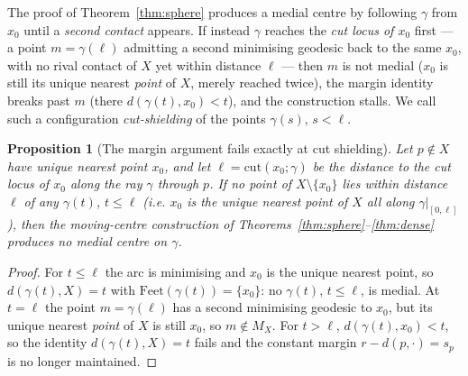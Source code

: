 \documentclass[11pt]{article}
\newtheorem{proposition}[theorem]{Proposition}
\theoremstyle{remark}
\newcommand{\X}{X}
\newcommand{\Mx}{M_{\X}}
\begin{document}
The proof of Theorem~\ref{thm:sphere} produces a medial centre by
following $\gamma$ from $x_{0}$ until a \emph{second contact} appears. If
instead $\gamma$ reaches the \emph{cut locus of $x_{0}$} first --- a point
$m=\gamma(\ell)$ admitting a second minimising geodesic back to the same
$x_{0}$, with no rival contact of $\X$ yet within distance $\ell$ --- then
$m$ is not medial ($x_{0}$ is still its unique nearest \emph{point} of
$\X$, merely reached twice), the margin identity breaks past $m$ (there
$d(\gamma(t),x_{0})<t$), and the construction stalls. We call such a
configuration \emph{cut-shielding} of the points $\gamma(s)$, $s<\ell$.

\begin{proposition}[The margin argument fails exactly at cut shielding]
\label{prop:obstruction}
Let $p\notin\X$ have unique nearest point $x_{0}$, and let
$\ell=\mathrm{cut}(x_{0};\gamma)$ be the distance to the cut locus of
$x_{0}$ along the ray $\gamma$ through $p$. If no point of $\X\setminus
\{x_{0}\}$ lies within distance $\ell$ of any $\gamma(t)$, $t\le\ell$
(i.e. $x_{0}$ is the unique nearest \emph{point} of $\X$ all along
$\gamma|_{[0,\ell]}$), then the moving-centre construction of
Theorems~\ref{thm:sphere}--\ref{thm:dense} produces no medial centre on
$\gamma$.
\end{proposition}

\begin{proof}
For $t\le\ell$ the arc is minimising and $x_{0}$ is the unique nearest
point, so $d(\gamma(t),\X)=t$ with $\mathrm{Feet}(\gamma(t))=\{x_{0}\}$:
no $\gamma(t)$, $t\le\ell$, is medial. At $t=\ell$ the point $m=
\gamma(\ell)$ has a second minimising geodesic to $x_{0}$, but its unique
nearest \emph{point} of $\X$ is still $x_{0}$, so $m\notin\Mx$. For
$t>\ell$, $d(\gamma(t),x_{0})<t$, so the identity $d(\gamma(t),\X)=t$
fails and the constant margin $r-d(p,\cdot)=s_{p}$ is no longer
maintained.
\end{proof}
\end{document}
